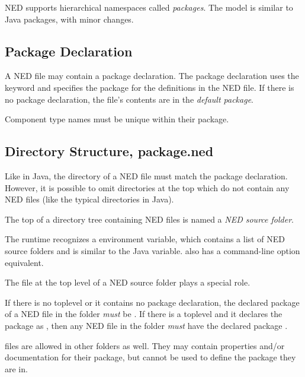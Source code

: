 NED supports hierarchical namespaces called \textit{packages}. The model
is similar to Java packages, with minor changes.


\subsection{Package Declaration}
\label{sec:ned-ref:package-declaration}

A NED file may contain a package declaration. The package declaration
uses the  keyword and specifies the package for the
definitions in the NED file. If there is no package declaration, the file's
contents are in the \textit{default package}.

Component type names must be unique within their package.


\subsection{Directory Structure, package.ned}
\label{sec:ned-ref:directory-structure}

Like in Java, the directory of a NED file must match the package
declaration. However, it is possible to omit directories at the top which do
not contain any NED files (like the typical 
directories in Java).

The top of a directory tree containing NED files is named a \textit{NED source
folder}.

\begin{note}
The {\opp} runtime recognizes a  environment variable, which
contains a list of NED source folders and is similar to the Java 
variable.  also has a command-line option equivalent.
\end{note}

The  file at the top level of a NED source folder plays a
special role.

If there is no toplevel  or it contains no package declaration,
the declared package of a NED file in the folder 
\textit{must} be .
If there is a toplevel  and it declares the package as
, then any NED file in the folder 
\textit{must} have the declared package .

\begin{note}
     files are allowed in other folders as well.
    They may contain properties and/or documentation for their package,
    but cannot be used to define the package they are in.
\end{note}




